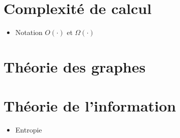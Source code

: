 \begin{comment}
\end{comment}

\appendix

\chapter{Complexité de calcul}
\label{chap:complexite_calcul}

\begin{itemize}
  \item Notation $O(\cdot)$ et $\Omega(\cdot)$
\end{itemize}

\chapter{Théorie des graphes}
\label{chap:theo_graphe}

\chapter{Théorie de l'information}
\label{chap:theo_info}

\begin{itemize}
  \item Entropie
\end{itemize}



